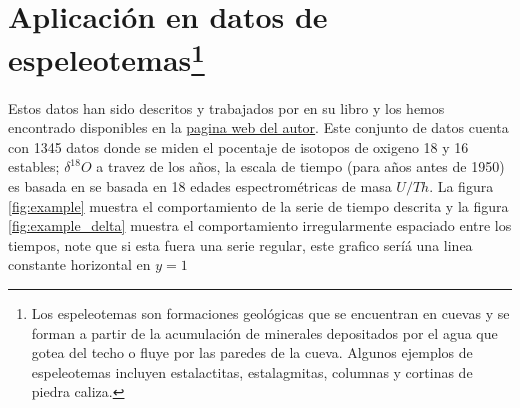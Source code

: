 \section{Aplicación en datos de espeleotemas\protect\footnote{Los espeleotemas son formaciones geológicas que se encuentran en cuevas y se forman a partir de la acumulación de minerales depositados por el agua que gotea del techo o fluye por las paredes de la cueva. Algunos ejemplos de espeleotemas incluyen estalactitas, estalagmitas, columnas y cortinas de piedra caliza.}}

Estos datos han sido descritos y trabajados por \cite{mudelse2014climate} en su libro y los hemos encontrado disponibles en la \href{https://www.manfredmudelsee.com/}{pagina web del autor}. Este conjunto de datos cuenta con 1345 datos donde se miden el pocentaje de 
isotopos de oxigeno 18 y 16 estables; $\delta^{18}O$ a travez de los años, la escala de tiempo (para años antes de 1950) es basada en
se basada en 18 edades espectrométricas de masa $U/Th$. La figura \ref{fig:example} muestra el comportamiento de la serie de tiempo descrita y la figura 
\ref{fig:example_delta} muestra el comportamiento irregularmente espaciado entre los tiempos, note que si esta fuera una serie regular, este grafico seríá una
linea constante horizontal en $y=1$



